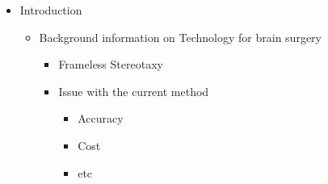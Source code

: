\documentclass[12pt]{spieman}  %
\begin{document}
\begin{itemize}
    \item Introduction
    \begin{itemize}
        \item Background information on Technology for brain surgery
        \begin{itemize}
            \item Frameless Stereotaxy
        \end{itemize}
        \begin{itemize}
            \item Issue with the current method
            \begin{itemize}
                \item Accuracy
                \item Cost
                \item etc
            \end{itemize}


\end{itemize}
\end{itemize}
\end{itemize}
\end{document}
